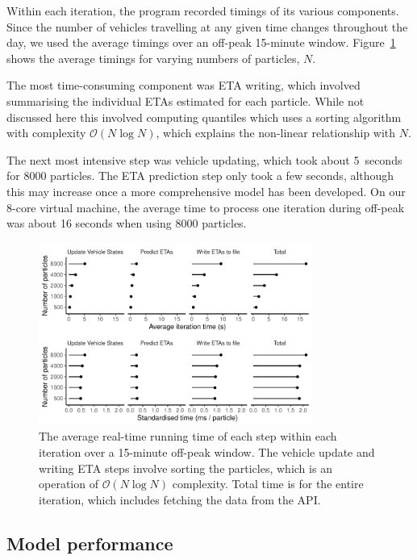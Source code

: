\documentclass[times, doublespace]{anzsauth}
\begin{document}
Within each iteration, the program recorded timings of its various components.
Since the number of vehicles travelling at any given time changes throughout the day,
we used the average timings over an off-peak 15-minute window.
Figure~\ref{fig:timings} shows the average timings for
varying numbers of particles, $N$.


The most time-consuming component was ETA writing,
which involved summarising the individual ETAs estimated for each particle.
While not discussed here this involved computing quantiles which uses a sorting algorithm
with complexity $\mathcal{O}(N \log N)$,
which explains the non-linear relationship with $N$.


The next most intensive step was vehicle updating,
which took about 5~seconds for 8000 particles.
The ETA prediction step only took a few seconds,
although this may increase once a more comprehensive model has been developed.
On our 8-core virtual machine,
the average time to process one iteration during off-peak
was about 16 seconds when using 8000 particles.

\begin{figure}[tb]
    \centering
    \includegraphics[width=0.8\textwidth]{figures/04_model_results_timing.pdf}
    \caption{
        The average real-time running time of each step within each iteration
        over a 15-minute off-peak window.
        The vehicle update and writing ETA steps involve sorting the particles,
        which is an operation of $\mathcal{O}(N\log N)$ complexity.
        Total time is for the entire iteration, which includes fetching the data from the API.
    }
    \label{fig:timings}
\end{figure}




\subsection{Model performance}
\label{sec:model_perf}
\end{document}
